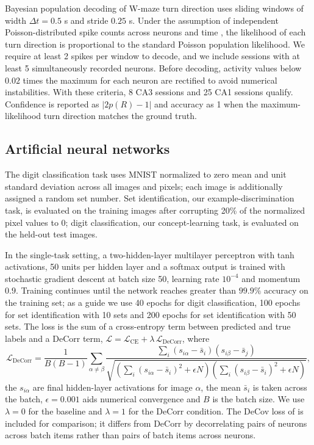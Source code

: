 \documentclass[11pt]{article}
\begin{document}
Bayesian population decoding of W-maze turn direction uses sliding windows
of width $\Delta t = 0.5$ s and stride $0.25$ s. Under the assumption of
independent Poisson-distributed spike counts across neurons and time
\cite{zeithamova2019brain}, the likelihood of each turn direction is
proportional to the standard Poisson population likelihood. We require at
least 2 spikes per window to decode, and we include sessions with at least
5 simultaneously recorded neurons. Before decoding, activity values below
$0.02$ times the maximum for each neuron are rectified to avoid numerical
instabilities. With these criteria, 8 CA3 sessions and 25 CA1 sessions
qualify. Confidence is reported as $|2p(R) - 1|$ and accuracy as 1 when the
maximum-likelihood turn direction matches the ground truth.

\subsection{Artificial neural networks}

The digit classification task uses MNIST \cite{lecun1998gradient} normalized
to zero mean and unit standard deviation across all images and pixels; each
image is additionally assigned a random set number. Set identification, our
example-discrimination task, is evaluated on the training images after
corrupting 20\% of the normalized pixel values to 0; digit classification,
our concept-learning task, is evaluated on the held-out test images.

In the single-task setting, a two-hidden-layer multilayer perceptron with
tanh activations, 50 units per hidden layer and a softmax output is trained
with stochastic gradient descent at batch size 50, learning rate $10^{-4}$
and momentum $0.9$. Training continues until the network reaches greater
than $99.9\%$ accuracy on the training set; as a guide we use 40 epochs for
digit classification, 100 epochs for set identification with 10 sets and
200 epochs for set identification with 50 sets. The loss is the sum of a
cross-entropy term between predicted and true labels and a DeCorr term,
$\mathcal{L} = \mathcal{L}_{\mathrm{CE}} + \lambda\, \mathcal{L}_{\mathrm{DeCorr}}$,
where
\begin{equation}
\mathcal{L}_{\mathrm{DeCorr}} = \frac{1}{B(B-1)} \sum_{\alpha \neq \beta}
\frac{\sum_i (s_{i\alpha} - \bar s_i)(s_{i\beta} - \bar s_j)}
{\sqrt{\left(\sum_i (s_{i\alpha}-\bar s_i)^2 + \epsilon N\right)
\left(\sum_i (s_{i\beta}-\bar s_i)^2 + \epsilon N\right)}},
\end{equation}
the $s_{i\alpha}$ are final hidden-layer activations for image $\alpha$, the
mean $\bar s_i$ is taken across the batch, $\epsilon = 0.001$ aids numerical
convergence and $B$ is the batch size. We use $\lambda = 0$ for the baseline
and $\lambda = 1$ for the DeCorr condition. The DeCov loss of
\cite{cogswell2016reducing} is included for comparison; it differs from
DeCorr by decorrelating pairs of neurons across batch items rather than pairs
of batch items across neurons.
\end{document}
